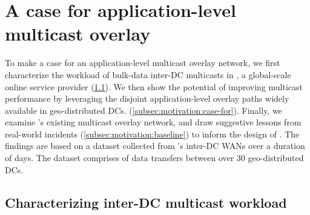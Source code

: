 \section{A case for application-level multicast overlay}
\label{sec:motivation}


To make a case for an 
application-level multicast overlay network,
we first characterize the workload of bulk-data 
inter-DC multicasts in \company, a global-scale 
online service provider
(\Section\ref{subsec:motivation:multicast-traffic}).
We then show the potential of improving multicast performance
by leveraging the disjoint application-level overlay paths 
widely available in geo-distributed DCs.
(\Section\ref{subsec:motivation:case-for}).
Finally, we examine \company's existing multicast overlay 
network, and draw suggestive lessons from real-world 
incidents (\Section\ref{subsec:motivation:baseline}) 
to inform the design of \name.
The findings are based on a dataset collected from \company's 
inter-DC WANs over a duration of \fillme days. 
The dataset comprises of \fillme data transfers
between over 30 geo-distributed DCs.




\subsection{Characterizing inter-DC multicast workload}
\label{subsec:motivation:multicast-traffic}



